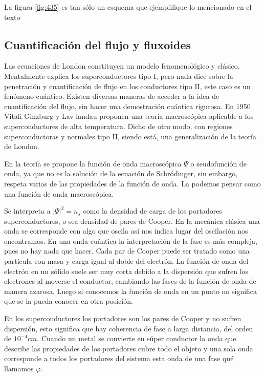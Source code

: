 La figura \ref{fig:435} es tan sólo un esquema que ejemplifique lo mencionado en el texto


\subsection{Cuantificación del flujo y fluxoides}

Las ecuaciones de London constituyen un modelo fenomenológico y clásico. Mentalmente explica los superconductores tipo I, pero nada dice sobre la penetración y cuantificación de flujo en los conductores tipo II, este caso es un fenómeno cuántico. Existen diversas maneras de acceder a la idea de cuantificación del flujo, sin hacer una demostración cuántica rigurosa. En 1950 Vitali Ginzburg y Lav landau proponen una teoría macroscópica aplicable a los superconductores de alta temperatura. Dicho de otro modo, con regiones superconductoras y normales tipo II, siendo está, una generalización de la teoría de London.

En la teoría se propone la función de onda macroscópica $\Psi$ o seudofunción de onda, ya que no es la solución de la ecuación de Schródinger, sin embargo, respeta varias de las propiedades de la función de onda. La podemos pensar como una función de onda macroscópica.

Se interpreta a $\vert \Psi  \vert^{2}=n_{s}$ como la densidad de carga de los portadores superconductores, o sea densidad de pares de Cooper. En la mecánica clásica una onda se corresponde con algo que oscila así nos indica lugar del oscilación nos encontramos. En una onda cuántica la interpretación de la fase es más compleja, pues no hay nada que hacer. Cada par de Cooper puede ser tratado como una partícula con masa y carga igual al doble del electrón. La función de onda del electrón en un sólido suele ser muy corta debido a la dispersión que sufren los electrones al moverse el conductor, cambiando las fases de la función de onda de manera azarosa. Luego si conocemos la función de onda en un punto no significa que se la pueda conocer en otra posición.

En los superconductores los portadores son los pares de Cooper y no sufren dispersión, esto significa que hay coherencia de fase a larga distancia, del orden de $10^{-4}cm$. Cuando un metal se convierte en súper conductor la onda que describe las propiedades de los portadores cubre todo el objeto y una sola onda corresponde a todos los portadores del sistema esta onda de una fase qué llamamos $\varphi$.

